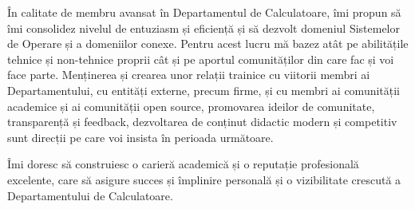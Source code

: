 \documentclass[11pt,a4paper]{article}
\begin{document}
În calitate de membru avansat în Departamentul de Calculatoare, îmi propun să
îmi consolidez nivelul de entuziasm și eficiență și să dezvolt domeniul
Sistemelor de Operare și a domeniilor conexe. Pentru acest lucru mă bazez atât
pe abilitățile tehnice și non-tehnice proprii cât și pe aportul comunităților
din care fac și voi face parte. Menținerea și crearea unor relații trainice cu
viitorii membri ai Departamentului, cu entități externe, precum firme, și cu
membri ai comunității academice și ai comunității open source, promovarea
ideilor de comunitate, transparență și feedback, dezvoltarea de conținut
didactic modern și competitiv sunt direcții pe care voi insista în perioada
următoare.

Îmi doresc să construiesc o carieră academică și o reputație profesională
excelente, care să asigure succes și împlinire personală și o vizibilitate
crescută a Departamentului de Calculatoare.
\end{document}
